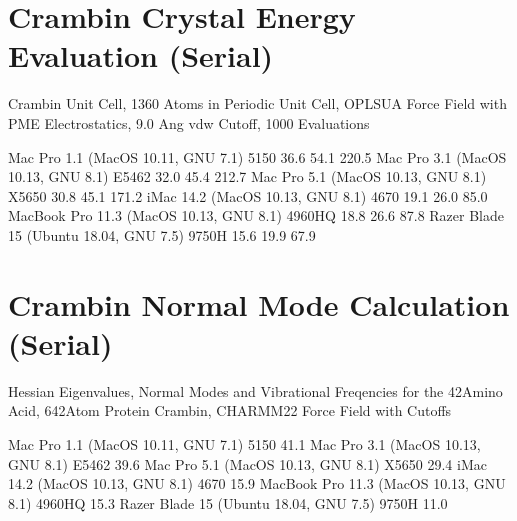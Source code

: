\documentclass[letterpaper,11pt,english]{sphinxmanual}
\begin{document}
\section{Crambin Crystal Energy Evaluation (Serial)}
\label{\detokenize{text/benchmarks:crambin-crystal-energy-evaluation-serial}}
Crambin Unit Cell, 1360 Atoms in Periodic Unit Cell, OPLS\sphinxhyphen{}UA Force Field with PME Electrostatics, 9.0 Ang vdw Cutoff, 1000 Evaluations


\begin{sphinxVerbatim}[commandchars=\\\{\}]
Mac Pro 1.1 (MacOS 10.11, GNU 7.1)             5150        36.6         54.1       220.5
Mac Pro 3.1 (MacOS 10.13, GNU 8.1)            E5462        32.0         45.4       212.7
Mac Pro 5.1 (MacOS 10.13, GNU 8.1)            X5650        30.8         45.1       171.2
iMac 14.2 (MacOS 10.13, GNU 8.1)               4670        19.1         26.0        85.0
MacBook Pro 11.3 (MacOS 10.13, GNU 8.1)      4960HQ        18.8         26.6        87.8
Razer Blade 15 (Ubuntu 18.04, GNU 7.5)        9750H        15.6         19.9        67.9
\end{sphinxVerbatim}


\section{Crambin Normal Mode Calculation (Serial)}
\label{\detokenize{text/benchmarks:crambin-normal-mode-calculation-serial}}
Hessian Eigenvalues, Normal Modes and Vibrational Freqencies for the 42\sphinxhyphen{}Amino Acid, 642\sphinxhyphen{}Atom Protein Crambin, CHARMM\sphinxhyphen{}22 Force Field with Cutoffs


\begin{sphinxVerbatim}[commandchars=\\\{\}]
Mac Pro 1.1 (MacOS 10.11, GNU 7.1)             5150                41.1
Mac Pro 3.1 (MacOS 10.13, GNU 8.1)            E5462                39.6
Mac Pro 5.1 (MacOS 10.13, GNU 8.1)            X5650                29.4
iMac 14.2 (MacOS 10.13, GNU 8.1)               4670                15.9
MacBook Pro 11.3 (MacOS 10.13, GNU 8.1)      4960HQ                15.3
Razer Blade 15 (Ubuntu 18.04, GNU 7.5)        9750H                11.0
\end{sphinxVerbatim}
\end{document}
